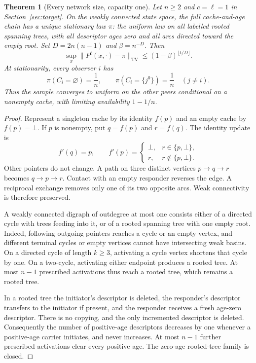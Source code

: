 \documentclass[11pt]{article}
\newtheorem{theorem}{Theorem}
\newcommand{\TV}{\mathrm{TV}}
\begin{document}
\begin{theorem}[Every network size, capacity one]
\label{thm:mandatoryone}
Let $n\ge2$ and $c=\ell=1$ in
Section~\ref{sec:target}. On the weakly connected state
space, the full cache-and-age chain has a unique stationary law
$\pi$: the uniform law on all labelled rooted spanning trees,
with all descriptor ages zero and all arcs directed toward the
empty root. Set $D=2n(n-1)$ and $\beta=n^{-D}$. Then
\[
 \sup_x\|P^t(x,\cdot)-\pi\|_{\TV}
 \le(1-\beta)^{\lfloor t/D\rfloor}.
\]
At stationarity, every observer $i$ has
\[
 \pi(C_i=\varnothing)=\frac1n,\qquad
 \pi(C_i=\{j^0\})=\frac1n\quad(j\ne i).
\]
Thus the sample converges to uniform on the other peers conditional
on a nonempty cache, with limiting availability $1-1/n$.
\end{theorem}
\begin{proof}
Represent a singleton cache by its identity $f(p)$ and an empty
cache by $f(p)=\bot$. If $p$ is nonempty, put $q=f(p)$ and
$r=f(q)$. The identity update is
\[
 f'(q)=p,\qquad
 f'(p)=
 \begin{cases}
  \bot,& r\in\{p,\bot\},\\
  r,& r\notin\{p,\bot\}.
 \end{cases}
\]
Other pointers do not change. A path on three distinct vertices
$p\to q\to r$ becomes $q\to p\to r$. Contact with an empty
responder reverses the edge. A reciprocal exchange removes only
one of its two opposite arcs. Weak connectivity is therefore
preserved.

A weakly connected digraph of outdegree at most one consists
either of a directed cycle with trees feeding into it, or of a
rooted spanning tree with one empty root. Indeed, following outgoing
pointers reaches a cycle or an empty vertex, and different terminal
cycles or empty vertices cannot have intersecting weak basins.
On a directed cycle of length $k\ge3$, activating a cycle vertex
shortens that cycle by one. On a two-cycle, activating either
endpoint produces a rooted tree. At most $n-1$ prescribed
activations thus reach a rooted tree, which remains a rooted tree.

In a rooted tree the initiator's descriptor is deleted, the
responder's descriptor transfers to the initiator if present, and
the responder receives a fresh age-zero descriptor. There is no
copying, and the only incremented descriptor is deleted.
Consequently the number of positive-age descriptors decreases by
one whenever a positive-age carrier initiates, and never increases.
At most $n-1$ further prescribed activations clear every positive
age. The zero-age rooted-tree family is closed.


\end{proof}
\end{document}
